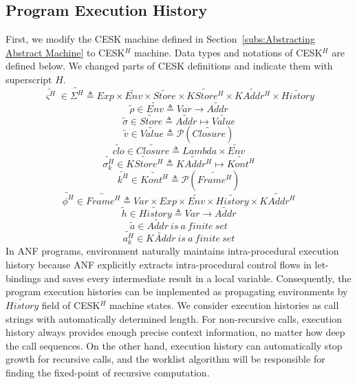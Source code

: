 \documentclass{article}
\begin{document}
\subsection{Program Execution History}
\label{sub:Program Execution History}
First, we modify the CESK machine defined in Section~\ref{subs:Abstracting Abstract Machine} to CESK$^H$ machine.
Data types and notations of CESK$^H$ are defined below. We changed parts of CESK definitions and indicate them with superscript $H$.
\[
\tag{states}
\widetilde{\varsigma^H}\in\widetilde{\Sigma^H} \triangleq Exp \times \widetilde{Env} \times \widetilde{Store}
\times \widetilde{KStore^H} \times \widetilde{KAddr^H} \times \widetilde{History}
\]
\[
\tag{environments}
\tilde{\rho} \in \widetilde{Env} \triangleq Var \to \widetilde{Addr}
\]
\[
\tag{stores}
\tilde{\sigma} \in \widetilde{Store} \triangleq \widetilde{Addr} \mapsto \widetilde{Value}
\]
\[
\tag{abstract values}
\tilde{v} \in \widetilde{Value} \triangleq \mathcal{P}(\widetilde{Closure})
\]
\[
\tag{closures}
\widetilde{clo} \in \widetilde{Closure} \triangleq Lambda \times \widetilde{Env}
\]
\[
\tag{continuation stores}
\widetilde{\sigma_k^H} \in \widetilde{KStore^H} \triangleq  \widetilde{KAddr^H} \mapsto  \widetilde{Kont^H}
\]
\[
\tag{abstract continuations}
\widetilde{k^H} \in  \widetilde{Kont^H} \triangleq  \mathcal{P}(\widetilde{Frame^H})
\]
\[
\tag{stack frames}
\widetilde{\phi^H} \in  \widetilde{Frame^H} \triangleq Var \times Exp \times  \widetilde{Env} \times \widetilde{History} \times  \widetilde{KAddr^H}
\]
\[
\tag{histories}
\tilde{h} \in \widetilde{History} \triangleq Var \to \widetilde{Addr}
\]
\[
\tag{value addresses}
\tilde{a} \in \widetilde{Addr} \ is\ a\ finite\ set
\]
\[
\tag{continuation addresses}
\widetilde{a_k^H} \in \widetilde{KAddr} \ is\ a\ finite\ set
\]
In ANF programs, environment naturally maintains intra-procedural execution history because ANF explicitly extracts intra-procedural control flows in let-bindings and saves every intermediate result in a local variable.
Consequently, the program execution histories can be implemented as propagating environments by $\widetilde{History}$ field of CESK$^H$ machine states.
We consider execution histories as call strings with automatically determined length. For non-recursive calls, execution history always provides enough precise context information, no matter how deep the call sequences. On the other hand, execution history can automatically stop growth for recursive calls, and the worklist algorithm will be responsible for finding the fixed-point of recursive computation.
\end{document}
